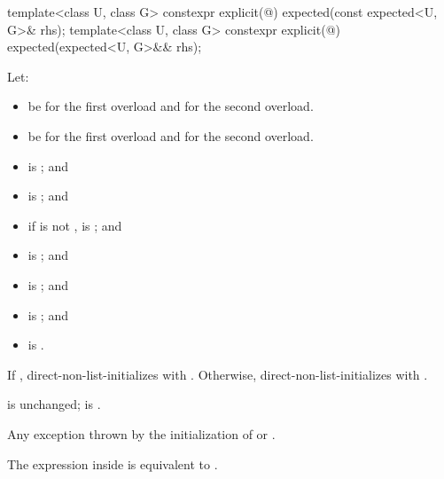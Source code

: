%
\begin{itemdecl}
template<class U, class G>
  constexpr explicit(@\seebelow@) expected(const expected<U, G>& rhs);
template<class U, class G>
  constexpr explicit(@\seebelow@) expected(expected<U, G>&& rhs);
\end{itemdecl}

\begin{itemdescr}
\pnum
Let:
\begin{itemize}
\item
{} be  for the first overload and
 for the second overload.
\item
{} be  for the first overload and
 for the second overload.
\end{itemize}

\pnum
\constraints
\begin{itemize}
\item
{} is ; and
\item
{} is ; and
\item
if  is not \cv{} ,
 is ; and
\item
{} is ; and
\item
{} is ; and
\item
{} is ; and
\item
{} is .
\end{itemize}

\pnum
\effects
If ,
direct-non-list-initializes  with .
Otherwise,
direct-non-list-initializes  with .

\pnum
\ensures
{} is unchanged;
 is .

\pnum
\throws
Any exception thrown by the initialization of  or .

\pnum
\remarks
The expression inside  is equivalent to
.
\end{itemdescr}

